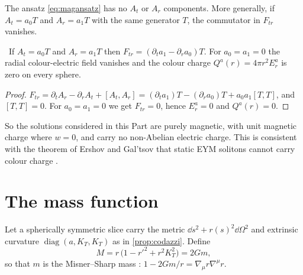 The ansatz \eqref{eq:magansatz} has no $A_t$ or $A_r$ components. More generally, if $A_t=a_0T$ and $A_r=a_1T$ with the same generator $T$, the commutator in $F_{tr}$ vanishes.

\begin{proposition}\label{prop:nocolour}\ver\
If $A_t=a_0T$ and $A_r=a_1T$ then $F_{tr}=(\partial_ta_1-\partial_ra_0)T$. For $a_0=a_1=0$ the radial colour-electric field vanishes and the colour charge $Q^a(r)=4\pi r^2E^a_r$ is zero on every sphere.
\end{proposition}
\begin{proof}
$F_{tr}=\partial_tA_r-\partial_rA_t+[A_t,A_r]=(\partial_ta_1)T-(\partial_ra_0)T+a_0a_1[T,T]$, and $[T,T]=0$. For $a_0=a_1=0$ we get $F_{tr}=0$, hence $E^a_r=0$ and $Q^a(r)=0$.
\end{proof}


So the solutions considered in this Part are purely magnetic, with unit magnetic charge where $w=0$, and carry no non-Abelian electric charge. This is consistent with the theorem of Ershov and Gal'tsov that static EYM solitons cannot carry colour charge \cite{VolkovGaltsov1999}.

\section{The mass function}

Let a spherically symmetric slice carry the metric $\dd s^2+r(s)^2\dd\Omega^2$ and extrinsic curvature $\operatorname{diag}(a,K_T,K_T)$ as in \cref{prop:codazzi}. Define
\[
M=r\,\bigl(1-r'^2+r^2K_T^2\bigr)=2Gm ,
\]
so that $m$ is the Misner--Sharp mass \cite{MisnerSharp1964}: $1-2Gm/r=\nabla_\mu r\nabla^\mu r$.

